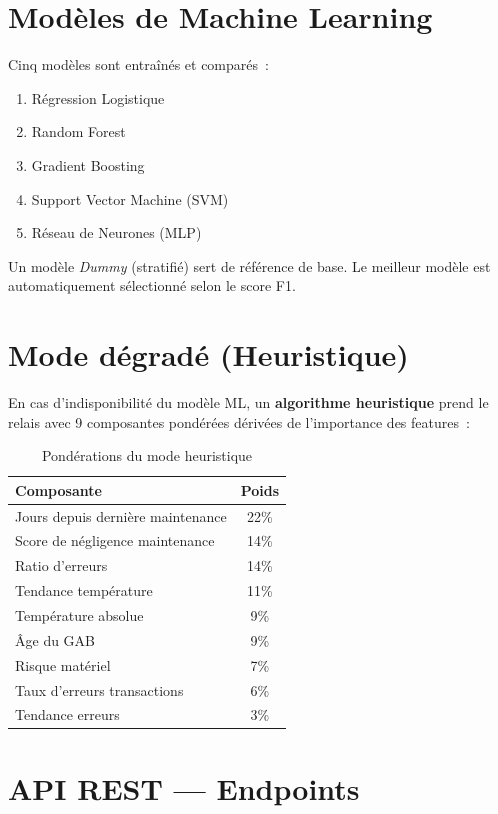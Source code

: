 \documentclass[a4paper,12pt]{report}
\begin{document}
\section{Modèles de Machine Learning}

Cinq modèles sont entraînés et comparés~:

\begin{enumerate}
    \item Régression Logistique
    \item Random Forest
    \item Gradient Boosting
    \item Support Vector Machine (SVM)
    \item Réseau de Neurones (MLP)
\end{enumerate}

Un modèle \textit{Dummy} (stratifié) sert de référence de base. Le meilleur modèle est automatiquement sélectionné selon le score F1.

\section{Mode dégradé (Heuristique)}

En cas d'indisponibilité du modèle ML, un \textbf{algorithme heuristique} prend le relais avec 9 composantes pondérées dérivées de l'importance des features~:

\begin{table}[h!]
\centering
\renewcommand{\arraystretch}{1.2}
\begin{tabular}{|l|c|}
\hline
\rowcolor{bpmblue!10}
\textbf{Composante} & \textbf{Poids} \\
\hline
Jours depuis dernière maintenance & 22\% \\
Score de négligence maintenance & 14\% \\
Ratio d'erreurs & 14\% \\
Tendance température & 11\% \\
Température absolue & 9\% \\
Âge du GAB & 9\% \\
Risque matériel & 7\% \\
Taux d'erreurs transactions & 6\% \\
Tendance erreurs & 3\% \\
\hline
\end{tabular}
\caption{Pondérations du mode heuristique}
\end{table}

\section{API REST — Endpoints}
\end{document}
